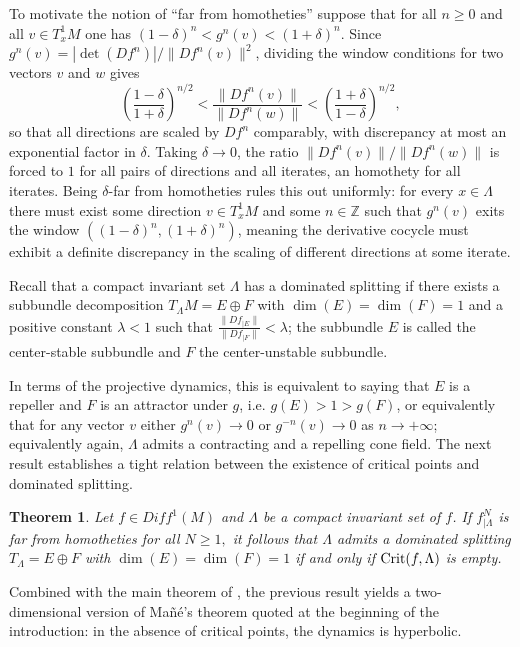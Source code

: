 \documentclass[a4paper,11pt]{article}
\newtheorem{theorem}{Theorem}
\theoremstyle{definition}
\def\La{\Lambda}
\def\la{\lambda}
\def\La{\Lambda}
\begin{document}
 To motivate the notion of  ``far from homotheties''  suppose that for all $n \geq 0$ and all $v \in T^1_xM$ one has $(1-\delta)^n < g^n(v) < (1+\delta)^n$. Since $g^n(v) = |\det(Df^n)|/\|Df^n(v)\|^2$, dividing the window conditions for two vectors $v$ and $w$ gives
$$
\left(\frac{1-\delta}{1+\delta}\right)^{n/2} <
\frac{\|Df^n(v)\|}{\|Df^n(w)\|} <
\left(\frac{1+\delta}{1-\delta}\right)^{n/2},
$$
so that all directions are scaled by $Df^n$ comparably, with discrepancy at most an exponential factor in $\delta$. Taking $\delta\to 0$, the ratio $\|Df^n(v)\|/\|Df^n(w)\|$ is forced to $1$ for all pairs of directions and all iterates, an homothety for all iterates.  Being $\delta$-far from homotheties rules this out uniformly: for every $x \in \Lambda$ there must exist some direction $v \in T^1_xM$ and some $n \in \mathbb{Z}$ such that $g^n(v)$ exits the window $((1-\delta)^n,(1+\delta)^n)$, meaning the derivative cocycle must exhibit a definite discrepancy in the scaling of different directions at some iterate.



Recall that a compact invariant set $\La$ has a dominated splitting if there exists a subbundle decomposition $T_\Lambda M = E \oplus F$ with $\dim(E) = \dim(F) = 1$ and a positive constant $\la < 1$ such that $\frac{\|Df_{|E}\|}{\|Df_{|F}\|} < \la$; the subbundle $E$ is called the center-stable subbundle and $F$ the center-unstable subbundle.
 
In terms of the projective dynamics, this is equivalent to saying that $E$ is a repeller and $F$ is an attractor under $g$, i.e. $g(E) > 1 > g(F)$, or equivalently that for any vector $v$ either $g^n(v) \to 0$ or $g^{-n}(v) \to 0$ as $n \to +\infty$; equivalently again, $\La$ admits a contracting and a repelling cone field. The next result establishes a tight relation between the existence of critical points and dominated splitting.
 
\begin{theorem}\label{p.existence}
Let $f\in Diff^1(M)$  and $\La$ be a  compact invariant set of $f$. If  $f^N_{|\La}$ is far from homotheties for all $N\geq 1,$ it follows that $\La$ admits a dominated splitting $T_\Lambda=E\oplus F$ with $\dim(E)=\dim(F)=1$ if and only if  ${\rm Crit}(f,\Lambda)$ is empty.

\end{theorem}


Combined with the main theorem of \cite{PS1}, the previous result yields a
two-dimensional version of Ma\~n\'e's theorem \cite{M} quoted at the beginning
of the introduction: in the absence of critical points, the dynamics is
hyperbolic.
\end{document}
